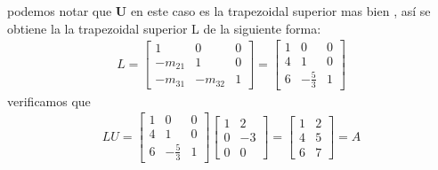 \begin{enumerate}[label=(\alph*)]
podemos notar que \textbf{U} en este caso es la trapezoidal superior mas bien , así se obtiene la la trapezoidal superior L de la siguiente forma:
\begin{align*}
L = 
\begin{bmatrix}
1 		&0	 &0\\
-m_{21} &1	 &0\\
-m_{31} &-m_{32} &1
\end{bmatrix}
= 
\begin{bmatrix}
1		&0		&0\\
4 		&1		&0\\
6		&-\frac{5}{3} &1
\end{bmatrix}
\end{align*}
verificamos que
\begin{align*}
LU = 
\begin{bmatrix}
1		&0		&0\\
4 		&1		&0\\
6		&-\frac{5}{3} &1
\end{bmatrix}
\begin{bmatrix}
1 & 2 \\
0 & -3 \\
0 & 0 
\end{bmatrix}
=
\begin{bmatrix}
1 & 2 \\
4 & 5 \\
6 & 7 
\end{bmatrix}
= A
\end{align*}
\end{enumerate}
